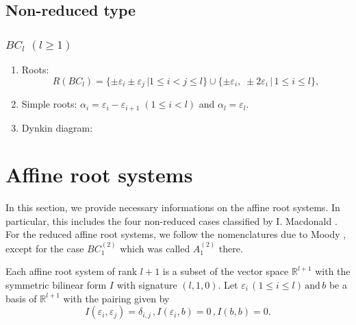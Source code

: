 \documentclass[11pt]{amsart}
\newcommand{\R}{\mathbb{R}}
\newcommand{\vep}{\varepsilon}
\begin{document}
{%
\subsection{Non-reduced type}
\subsubsection{$BC_l$\; $(l\geq 1)$}\label{sect_BC}

\begin{enumerate}
\item Roots: 
\[ R(BC_l)=\{\pm\vep_i\pm \vep_j\, \vert 1\leq i<j\leq l\} 
\cup \{\pm\vep_i, \; \pm2\vep_i\, \vert\, 1\leq i\leq l\}, \]
\item Simple roots: \; $\alpha_i=\vep_i-\vep_{i+1}\; (1\leq i<l)$ and $\alpha_l=\vep_l$. 
\item Dynkin diagram:
\begin{center}
\end{center}
\end{enumerate}


\section{Affine root systems} \label{sect_affine-root-system}
In this section, we provide necessary informations on the affine root systems.
In particular, this includes the four non-reduced cases classified by I. Macdonald \cite{Macdonald1972}. For the reduced affine root systems, we follow the nomenclatures due to Moody \cite{Moody1969}, except for the case $BC_1^{(2)}$ which was called $A_1^{(2)}$ there.

Each affine root system of rank ${l+1}$ is a subset of the vector space $\R^{l+1}$ with the symmetric bilinear form $I$ with signature $(l,1,0)$. Let $\vep_i \,(1 \leq i \leq l)\,  \text{and}\,  b$ be a basis of $\R^{l+1}$ with the pairing given by
\[
I(\vep_i,\vep_j)=\delta_{i,j}\,, I(\vep_i,b)=0\,, I(b,b)=0.
\]

}
\end{document}
